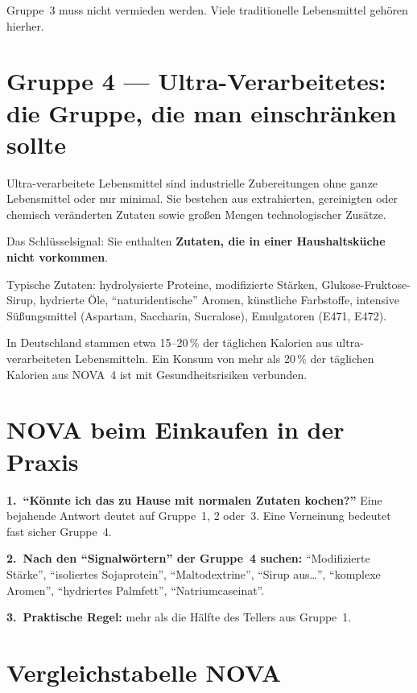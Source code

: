 \documentclass[a5paper,12pt,oneside,openany]{book}
\newcommand{\boxrot}[2]{%
  \begin{tcolorbox}[kastenbase,
    colback=rot!8!white, colframe=rot, title={#1}]
  #2\end{tcolorbox}}
\begin{document}
Gruppe~3 muss nicht vermieden werden. Viele traditionelle Lebensmittel
geh\"{o}ren hierher.

\section{Gruppe 4 --- Ultra-Verarbeitetes: die Gruppe, die man einschr\"{a}nken
sollte}

Ultra-verarbeitete Lebensmittel sind industrielle Zubereitungen ohne ganze
Lebensmittel oder nur minimal. Sie bestehen aus extrahierten, gereinigten
oder chemisch ver\"{a}nderten Zutaten sowie gro{\ss}en Mengen technologischer
Zus\"{a}tze.

Das Schl\"{u}sselsignal: Sie enthalten \textbf{Zutaten, die in einer
Haushaltsk\"{u}che nicht vorkommen}.

Typische Zutaten: hydrolysierte Proteine, modifizierte St\"{a}rken,
Glukose-Fruktose-Sirup, hydrierte \"{O}le, ``naturidentische'' Aromen,
k\"{u}nstliche Farbstoffe, intensive S\"{u}{\ss}ungsmittel (Aspartam, Saccharin,
Sucralose), Emulgatoren (E471, E472).

\boxrot{Wichtige Daten}{In Deutschland stammen etwa 15--20\,\% der t\"{a}glichen
Kalorien aus ultra-verarbeiteten Lebensmitteln. Ein Konsum von mehr als 20\,\%
der t\"{a}glichen Kalorien aus NOVA~4 ist mit Gesundheitsrisiken verbunden.}

\section{NOVA beim Einkaufen in der Praxis}

\textbf{1.~``K\"{o}nnte ich das zu Hause mit normalen Zutaten kochen?''}
Eine bejahende Antwort deutet auf Gruppe~1, 2 oder~3. Eine Verneinung bedeutet
fast sicher Gruppe~4.

\textbf{2.~Nach den ``Signalw\"{o}rtern'' der Gruppe~4 suchen:}
``Modifizierte St\"{a}rke'', ``isoliertes Sojaprotein'', ``Maltodextrine'',
``Sirup aus\ldots'', ``komplexe Aromen'', ``hydriertes Palmfett'',
``Natriumcaseinat''.

\textbf{3.~Praktische Regel:} mehr als die H\"{a}lfte des Tellers aus Gruppe~1.

\section{Vergleichstabelle NOVA}
\end{document}
